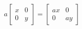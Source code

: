 \documentclass[preview]{standalone}
\begin{document}
\begin{center}
$a\begin{bmatrix} x & 0 \\ 0 & y \end{bmatrix} = \begin{bmatrix} ax & 0 \\ 0 & ay \end{bmatrix}$
\end{center}
\end{document}
